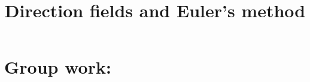 \documentclass[]{ximera}
\title{Direction fields and Euler's method}
\begin{document}
\begin{abstract}		\end{abstract}
\maketitle

\section{Group work:}
\end{document}
